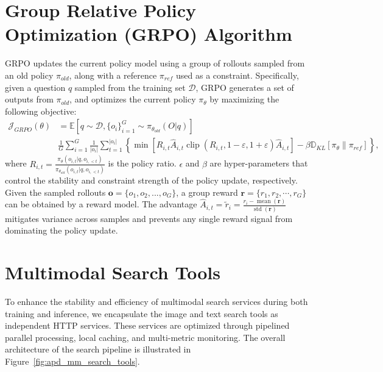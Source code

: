 \documentclass{article}
\begin{document}
\section{Group Relative Policy Optimization (GRPO) Algorithm}
\label{appendix:grpo}
GRPO updates the current policy model using a group of rollouts sampled from an old policy $\pi_{old}$, along with a reference $\pi_{ref}$ used as a constraint. Specifically, given a question $q$ sampled from the training set $\mathcal{D}$, GRPO generates a set of outputs from $\pi_{old}$, and optimizes the current policy $\pi_{\theta}$ by maximizing the following objective:
\begin{equation}
\begin{aligned}
\mathcal{J}_{GRPO}(\theta) & =\mathbb{E}[q\sim \mathcal{D},\{o_{i}\}_{i=1}^{G}\sim\pi_{\theta_{old}}(O|q)] \\
 & \frac{1}{G}\sum_{i=1}^{G}\frac{1}{|o_{i}|}\sum_{t=1}^{|o_{i}|}\left\{\min\left[R_{i,t}\hat{A}_{i,t}\operatorname{clip}\left(R_{i,t},1-\varepsilon,1+\varepsilon\right)\hat{A}_{i,t}\right]-\beta\mathbb{D}_{KL}\left[\pi_{\theta}\|\pi_{ref}\right]\right\},
\end{aligned}
\end{equation}
where $R_{i,t}=\frac{\pi_{\theta}(o_{i,t}|q,o_{i,<t})}{\pi_{\theta_{old}}(o_{i,t}|q,o_{i,<t})}$ is the policy ratio. $\epsilon$ and $\beta$ are hyper-parameters that control the stability and constraint strength of the policy update, respectively. Given the sampled rollouts $\mathbf{o} = \{o_1, o_2, ..., o_G\}$, a group reward $\mathbf{r} = \{r_1, r_2, \cdots, r_G \}$ can be obtained by a reward model. The advantage $\hat{A}_{i,t} = \tilde{r}_i = \frac{r_i - \operatorname{mean}(\mathbf{r})}{\operatorname{std}(\mathbf{r})}$ mitigates variance across samples and prevents any single reward signal from dominating the policy update.

\section{Multimodal Search Tools}
\label{appendix:mm-search-tools}

To enhance the stability and efficiency of multimodal search services during both training and inference, we encapsulate the image and text search tools as independent HTTP services. These services are optimized through pipelined parallel processing, local caching, and multi-metric monitoring. The overall architecture of the search pipeline is illustrated in Figure~\ref{fig:apd_mm_search_tools}.
\end{document}
